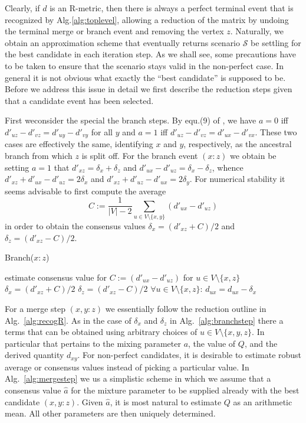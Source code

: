 \documentclass{article}
\begin{document}
Clearly, if $d$ is an R-metric, then there is always a perfect terminal
event that is recognized by Alg.\ref{alg:toplevel}, allowing a reduction of
the matrix by undoing the terminal merge or branch event and removing the
vertex $z$. Naturally, we obtain an approximation scheme that eventually
returns scenario $\mathcal{S}$ be settling for the best candidate in each
iteration step. As we shall see, some precautions have to be taken to
ensure that the scenario stays valid in the non-perfect case.  In general
it is not obvious what exactly the ``best candidate'' is supposed to
be. Before we address this issue in detail we first describe the reduction
steps given that a candidate event has been selected.

First weconsider the special the branch steps. By equ.(9) of
\cite{Prohaska:17a}, we have $a=0$ iff $d'_{uz}-d'_{vz} =
d'_{uy}-d'_{vy}$ for all $y$ and $a=1$ iff $d'_{uz}-d'_{vz} =
d'_{ux}-d'_{vx}$. These two cases are effectively the same, identifying $x$
and $y$, respectively, as the ancestral branch from which $z$ is split
off. For the branch event $(x:z)$ we obtain be setting $a=1$ that 
$d'_{xz}=\delta_x+\delta_z$ and
$d'_{ux}-d'_{uz}=\delta_x-\delta_z$, whence
$d'_{xz}+d'_{ux}-d'_{uz}=2\delta_x$ and
$d'_{xz}+d'_{uz}-d'_{ux}=2\delta_y$.  For numerical stability it seems
advisable to first compute the average
\begin{equation} 
  C := \frac{1}{|V|-2} \sum_{u\in V\setminus\{x,y\}} (d'_{ux}-d'_{uz})
\end{equation} 
in order to obtain the consensus values $\delta_x = (d'_{xz}+C)/2$ and
$\delta_z = (d'_{xz}-C)/2$.

\begin{algorithm}[H]
\caption{Branch($x:z$)} 
\label{alg:branchstep}
\SetAlgoLined
estimate consensus value for $C:=(d'_{ux}-d'_{uz})$ for $u\in
V\setminus\{x,z\}$ \;
$\delta_x = (d'_{xz}+C)/2$\;
$\delta_z = (d'_{xz}-C)/2$\;
$\forall u\in V\setminus\{x,z\}$: $d_{ux} =  d_{ux}-\delta_x$\;
\end{algorithm} 

For a merge step $(x,y:z)$ we essentially follow the reduction outline in
Alg.~\ref{alg:recogR}. As in the case of $\delta_x$ and $\delta_z$ in
Alg.~\ref{alg:branchstep} there a terms that can be obtained using
arbitrary choices of $u\in V\setminus\{x,y,z\}$. In particular that
pertains to the mixing parameter $a$, the value of $Q$, and the derived
quantity $d_{xy}$. For non-perfect candidates, it is desirable to estimate
robust average or consensus values instead of picking a particular value.
In Alg.~\ref{alg:mergestep} we us a simplistic scheme in which we assume
that a consensus value $\hat a$ for the mixture parameter to be supplied
already with the best candidate $(x,y:z)$. Given $\hat a$, it is most
natural to estimate $Q$ as an arithmetic mean. All other parameters are
then uniquely determined.
\end{document}
